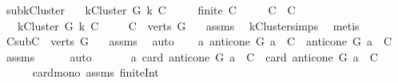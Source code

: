 \begin{isabellebody}
\isanewline
\isanewline
{}\isamarkupfalse%
\ sub{\isacharunderscore}{\kern0pt}kCluster{\isacharcolon}{\kern0pt}\isanewline
\ \ \ {\isachardoublequoteopen}kCluster\ G\ k\ C{\isachardoublequoteclose}\isanewline
\ \ \ \ \ {\isachardoublequoteopen}finite\ C{\isachardoublequoteclose}\isanewline
\ \ \ \ \ {\isachardoublequoteopen}C{\isacharprime}{\kern0pt}\ {\isasymsubseteq}\ C{\isachardoublequoteclose}\ \ \isanewline
\ \ \ {\isachardoublequoteopen}kCluster\ G\ k\ C{\isacharprime}{\kern0pt}{\isachardoublequoteclose}\ \isanewline
%
\isadelimproof
%
\endisadelimproof
%
\isatagproof
{}\isamarkupfalse%
{\isacharminus}{\kern0pt}\isanewline
\ \ \isamarkupfalse%
\ {\isachardoublequoteopen}C\ {\isasymsubseteq}\ verts\ G{\isachardoublequoteclose}\ \ \isamarkupfalse%
\ assms{\isacharparenleft}{\kern0pt}{}{\isacharparenright}{\kern0pt}\ \isamarkupfalse%
\ kCluster{\isachardot}{\kern0pt}simps\ \isamarkupfalse%
\ metis\ \isanewline
\ \ \isamarkupfalse%
\ \isamarkupfalse%
\ C{\isacharprime}{\kern0pt}{\isacharunderscore}{\kern0pt}sub{\isacharcolon}{\kern0pt}{\isachardoublequoteopen}C{\isacharprime}{\kern0pt}\ {\isasymsubseteq}\ verts\ G{\isachardoublequoteclose}\ \ \isamarkupfalse%
\ assms{\isacharparenleft}{\kern0pt}{}{\isacharparenright}{\kern0pt}\ \isamarkupfalse%
\ auto\isanewline
\ \ \isamarkupfalse%
\ {\isachardoublequoteopen}{\isasymAnd}a{\isachardot}{\kern0pt}\ {\isacharparenleft}{\kern0pt}anticone\ G\ a\ {\isasyminter}\ C{\isacharprime}{\kern0pt}{\isacharparenright}{\kern0pt}\ {\isasymsubseteq}\ {\isacharparenleft}{\kern0pt}anticone\ G\ a\ {\isasyminter}\ C{\isacharparenright}{\kern0pt}{\isachardoublequoteclose}\ \isamarkupfalse%
\ assms{\isacharparenleft}{\kern0pt}{}{\isacharparenright}{\kern0pt}\isanewline
\ \ \ \ \isamarkupfalse%
\ auto\ \isanewline
\ \ \isamarkupfalse%
\ \isamarkupfalse%
\ {\isachardoublequoteopen}{\isasymAnd}a{\isachardot}{\kern0pt}\ card\ {\isacharparenleft}{\kern0pt}anticone\ G\ a\ {\isasyminter}\ C{\isacharprime}{\kern0pt}{\isacharparenright}{\kern0pt}\ {\isasymle}\ card\ {\isacharparenleft}{\kern0pt}anticone\ G\ a\ {\isasyminter}\ C{\isacharparenright}{\kern0pt}{\isachardoublequoteclose}\isanewline
\ \ \ \ \isamarkupfalse%
\ card{\isacharunderscore}{\kern0pt}mono\ assms{\isacharparenleft}{\kern0pt}{}{\isacharparenright}{\kern0pt}\ finite{\isacharunderscore}{\kern0pt}Int\isanewline

\end{isabellebody}
